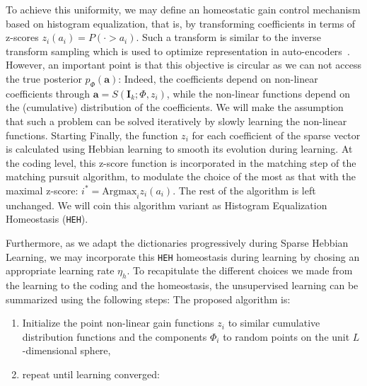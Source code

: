 \documentclass[a4paper, 11pt, draft]{article} %
\newcommand{\coef}{\mathbf{a}} %
\newcommand{\image}{\mathbf{I}} %
\newcommand{\dico}{\Phi} %
\newcommand{\norm}[1]{|\!| #1 |\!|}
\newcommand{\seeEq}[1]{Eq.~\ref{eq:#1}}%
\begin{document}
To achieve this uniformity, we may define an homeostatic gain control mechanism based on histogram equalization, that is, by transforming coefficients in terms of z-scores $z_i(a_i) = P( \cdot > a_i)$. Such a transform is similar to the inverse transform sampling which is used to optimize representation in auto-encoders~\citep{Ranzatto}.
However, an important point is that this objective is circular as we can not access the true posterior $p_\dico(\coef)$: Indeed, the coefficients depend on non-linear coefficients through $\coef = S(\image_k; \dico, z_i)$, while the non-linear functions depend on the (cumulative) distribution of the coefficients.
We will make the assumption that such a problem can be solved iteratively by slowly learning the non-linear functions. 
Starting 
Finally, the function $z_i$ for each coefficient of the sparse vector is calculated using Hebbian learning to smooth its evolution during learning. At the coding level, this z-score function is incorporated in the matching step of the matching pursuit algorithm, to modulate the choice of the most as that with the maximal z-score: $i^\ast = \mathrm{Argmax}_i z_i(a_i)$. The rest of the algorithm is left unchanged.
We will coin this algorithm variant as Histogram Equalization Homeostasis (\texttt{HEH}). 

Furthermore, as we adapt the dictionaries progressively during Sparse Hebbian Learning, we may incorporate this \texttt{HEH} homeostasis during learning by chosing an appropriate learning rate $\eta_h$. 
To recapitulate the different choices we made from the learning to the coding and the homeostasis, the unsupervised learning can be summarized using the following steps:
The proposed algorithm is:
\begin{enumerate}%
\item Initialize the point non-linear gain functions $z_i$ to similar cumulative distribution functions and the components $\dico_i$ to random points on the unit $L$-dimensional sphere,%
\item repeat until learning converged:%
\end{enumerate}
\end{document}
